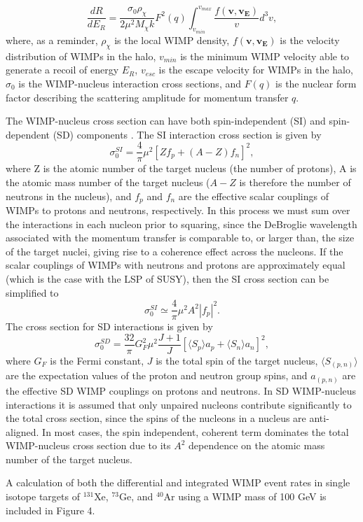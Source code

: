 \documentclass[a4paper,12pt]{article}
\begin{document}
\begin{equation} \label{final_dRdER_2}
\frac{dR}{dE_R}=\frac{\sigma_0 \rho_\chi}{2 \mu^2 M_\chi k} F^2(q)  \int_{v_{min}}^{v_{max}} \frac{f(\mathbf{v},\mathbf{v_E})}{v} d^3v, 
\end{equation}
where, as a reminder, $\rho_\chi$ is the local WIMP density, $f(\mathbf{v},\mathbf{v_E})$ is the velocity distribution of WIMPs in the halo, $v_{min}$ is the minimum WIMP velocity able to generate a recoil of energy $E_R$, $v_{esc}$ is the escape velocity for WIMPs in the halo, $\sigma_0$ is the WIMP-nucleus interaction cross sections, and $F(q)$ is the nuclear form factor describing the scattering amplitude for momentum transfer $q$.

The WIMP-nucleus cross section can have both spin-independent (SI) and spin-dependent (SD) components \cite{Shan}. The SI interaction cross section is given by
\[\sigma_0^{SI}=\frac{4}{\pi}\mu^2 [Z f_p + (A - Z) f_n]^2,\]
where Z is the atomic number of the target nucleus (the number of protons), A is the atomic mass number of the target nucleus ($A-Z$ is therefore the number of neutrons in the nucleus), and $f_p$ and $f_n$ are the effective scalar couplings of WIMPs to protons and neutrons, respectively.  In this process we must sum over the interactions in each nucleon prior to squaring, since the DeBroglie wavelength associated with the momentum transfer is comparable to, or larger than, the size of the target nuclei, giving rise to a coherence effect across the nucleons.  If the scalar couplings of WIMPs with neutrons and protons are approximately equal (which is the case with the LSP of SUSY), then the SI cross section can be simplified to
\[\sigma_0^{SI} \simeq \frac{4}{\pi}\mu^2 A^2 |f_p|^2. \]
The cross section for SD interactions is given by
\[\sigma_0^{SD}=\frac{32}{\pi}G_F^2\mu^2\frac{J+1}{J}[\langle S_p \rangle a_p + \langle S_n \rangle a_n]^2, \]
where $G_F$ is the Fermi constant, $J$ is the total spin of the target nucleus, $\langle S_{(p,n)} \rangle$ are the expectation values of the proton and neutron group spins, and $a_{(p,n)}$ are the effective SD WIMP couplings on protons and neutrons.  In SD WIMP-nucleus interactions it is assumed that only unpaired nucleons contribute significantly to the total cross section, since the spins of the nucleons in a nucleus are anti-aligned.  In most cases, the spin independent, coherent term dominates the total WIMP-nucleus cross section due to its $A^2$ dependence on the atomic mass number of the target nucleus.  

A calculation of both the differential and integrated WIMP event rates in single isotope targets of  $^{131}$Xe, $^{73}$Ge, and $^{40}$Ar using a WIMP mass of 100 GeV is included in Figure 4.
\end{document}
